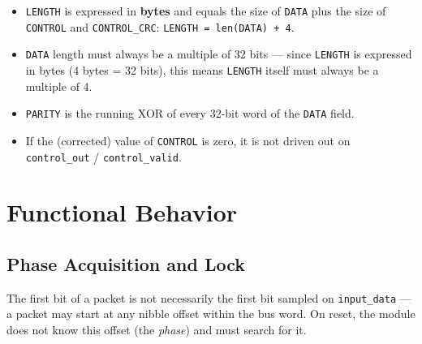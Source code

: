 \documentclass[11pt,a4paper]{article}
\begin{document}
\begin{center}
\end{center}

\begin{itemize}[leftmargin=1.4em, itemsep=3pt]
  \item \texttt{LENGTH} is expressed in \textbf{bytes} and equals the size of
        \texttt{DATA} plus the size of \texttt{CONTROL} and
        \texttt{CONTROL\_CRC}: \texttt{LENGTH = len(DATA) + 4}.
  \item \texttt{DATA} length must always be a multiple of 32 bits ---
        since \texttt{LENGTH} is expressed in bytes (4 bytes = 32 bits),
        this means \texttt{LENGTH} itself must always be a multiple of 4.
  \item \texttt{PARITY} is the running XOR of every 32-bit word of the
        \texttt{DATA} field.
  \item If the (corrected) value of \texttt{CONTROL} is zero, it is not
        driven out on \texttt{control\_out} / \texttt{control\_valid}.
\end{itemize}

\section{Functional Behavior}

\subsection{Phase Acquisition and Lock}
The first bit of a packet is not necessarily the first bit sampled on
\texttt{input\_data} --- a packet may start at any nibble offset within the
bus word. On reset, the module does not know this offset (the
\emph{phase}) and must search for it.
\end{document}
